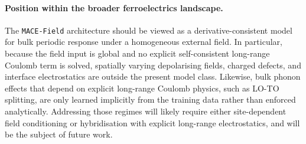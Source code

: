 \documentclass[aps,physrev,graphicx,amsmath,amssymb,
               reprint,superscriptaddress]{revtex4-2}
\begin{document}
\paragraph*{Position within the broader ferroelectrics landscape.}
The \texttt{MACE-Field} architecture should be viewed as a derivative-consistent model for bulk periodic response under a homogeneous external field. In particular, because the field input is global and no explicit self-consistent long-range Coulomb term is solved, spatially varying depolarising fields, charged defects, and interface electrostatics are outside the present model class. Likewise, bulk phonon effects that depend on explicit long-range Coulomb physics, such as LO-TO splitting, are only learned implicitly from the training data rather than enforced analytically. Addressing those regimes will likely require either site-dependent field conditioning or hybridisation with explicit long-range electrostatics, and will be the subject of future work.
\\
\end{document}
